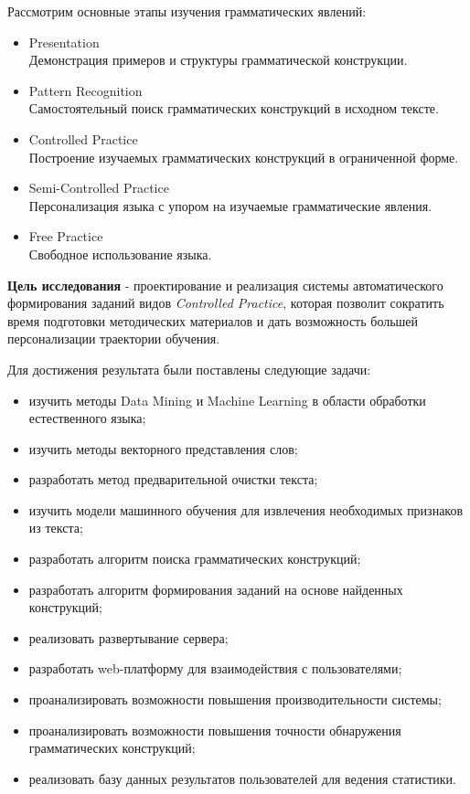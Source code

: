 Рассмотрим основные этапы изучения грамматических явлений:

\begin{itemize}
  \item Presentation \\ Демонстрация примеров и структуры грамматической конструкции.
  \item Pattern Recognition\\Самостоятельный поиск грамматических конструкций в исходном тексте.
 \item Controlled Practice\\Построение изучаемых грамматических конструкций в ограниченной форме.
 \item Semi-Controlled Practice\\Персонализация языка с упором на изучаемые грамматические явления.
 \item Free Practice\\Свободное использование языка.
\end{itemize}

\textbf{Цель исследования} - проектирование и реализация системы автоматического формирования заданий видов \emph{Controlled Practice}, которая позволит сократить время подготовки методических материалов и дать возможность большей персонализации траектории обучения.

Для достижения результата были поставлены следующие задачи:

\begin{itemize}
  \item изучить методы Data Mining и Machine Learning в области обработки естественного языка; 
  \item изучить методы векторного представления слов;
  \item разработать метод предварительной очистки текста;
  \item изучить модели машинного обучения для извлечения необходимых признаков из текста;
  \item разработать алгоритм поиска грамматических конструкций;
  \item разработать алгоритм формирования заданий на основе найденных конструкций;
  \item реализовать развертывание сервера;
  \item разработать web-платформу для взаимодействия с пользователями;
  \item проанализировать возможности повышения производительности системы;
  \item проанализировать возможности повышения точности обнаружения грамматических конструкций;
  \item реализовать базу данных результатов пользователей для ведения статистики.
\end{itemize}

